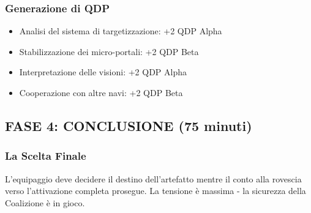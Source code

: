\documentclass[letterpaper,twocolumn,openany,nodeprecatedcode]{dndbook}
\begin{document}
\subsubsection{Generazione di QDP}
\begin{itemize}
    \item Analisi del sistema di targetizzazione: +2 QDP Alpha
    \item Stabilizzazione dei micro-portali: +2 QDP Beta
    \item Interpretazione delle visioni: +2 QDP Alpha
    \item Cooperazione con altre navi: +2 QDP Beta
\end{itemize}

\subsection{FASE 4: CONCLUSIONE (75 minuti)}
\subsubsection{La Scelta Finale}
L'equipaggio deve decidere il destino dell'artefatto mentre il conto alla rovescia verso l'attivazione completa prosegue. La tensione è massima - la sicurezza della Coalizione è in gioco.
\end{document}
